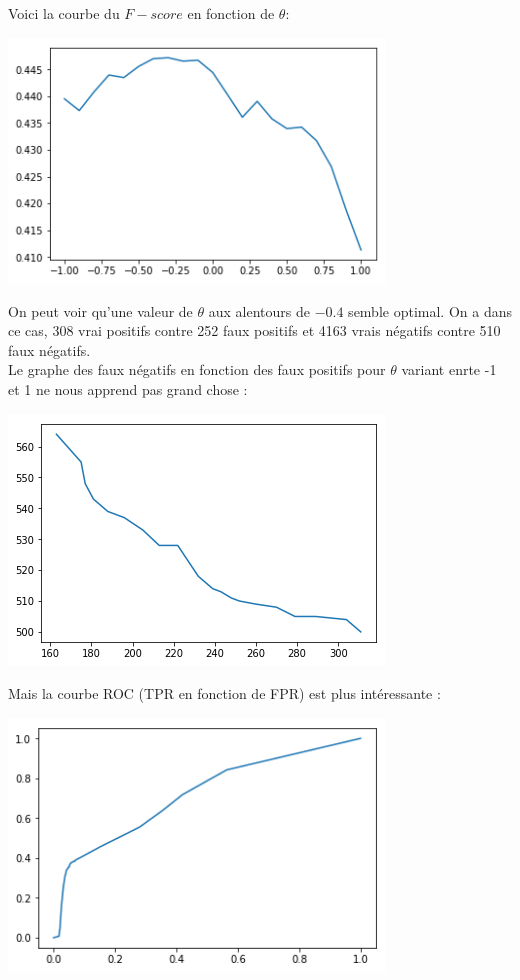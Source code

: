 \documentclass[a4paper,11pt]{article}
\begin{document}
Voici la courbe du $F-score$ en fonction de $\theta$:
\begin{center}
  \includegraphics[width=10cm]{"Fscore de theta"}
\end{center}
On peut voir qu'une valeur de $\theta$ aux alentours de $-0.4$ semble optimal. On a dans ce cas, 308 vrai positifs contre 252 faux positifs et 4163 vrais négatifs contre 510 faux négatifs.\\
Le graphe des faux négatifs en fonction des faux positifs pour $\theta$ variant enrte -1 et 1 ne nous apprend pas grand chose :
\begin{center}
  \includegraphics[width=10cm]{"fn de fp"}
\end{center}
Mais la courbe ROC (TPR en fonction de FPR) est plus intéressante :
\begin{center}
  \includegraphics[width=10cm]{"ROC"}
\end{center}
\end{document}
